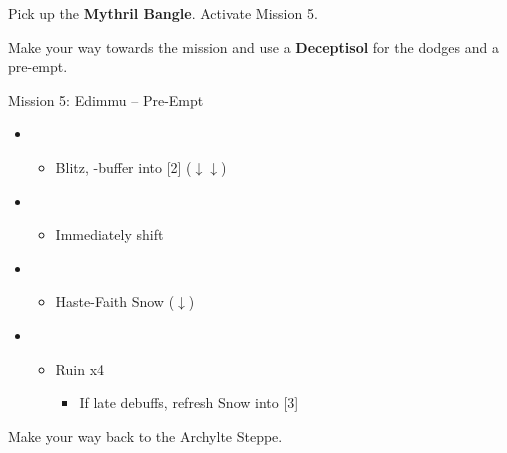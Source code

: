 Pick up the \textbf{Mythril Bangle}.
Activate Mission 5.

Make your way towards the mission and use a \textbf{Deceptisol} for the dodges and a pre-empt.

\begin{battle}{Mission 5: Edimmu -- Pre-Empt}
	\begin{itemize}
		\item \sixth
			\begin{itemize}
				\item Blitz, \rav-buffer into [2] ($\downarrow\downarrow$)
			\end{itemize}
		\item \second
			\begin{itemize}
				\item Immediately shift
			\end{itemize}
		\item \fourth
			\begin{itemize}
				\item Haste-Faith Snow ($\downarrow$)
			\end{itemize}
		\item \fifth
			\begin{itemize}
				\item Ruin x4
					\begin{itemize}
						\item If late debuffs, refresh Snow into [3]
					\end{itemize}
			\end{itemize}
	\end{itemize}
\end{battle}

Make your way back to the Archylte Steppe.
\newpage